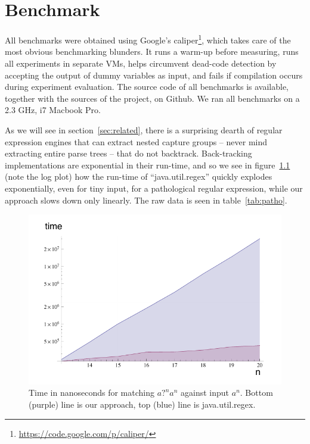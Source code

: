 \documentclass[11pt]{Thesis}
\theoremstyle{definition}
\newcommand{\Figref}[1]{figure~\ref{fig:#1}}
\newcommand{\Secref}[1]{section~\ref{sec:#1}}
\newcommand{\Tabref}[1]{table~\ref{tab:#1}}
\newcommand{\figlabel}[1]{\label{fig:#1}}
\newcommand{\seclabel}[1]{\label{sec:#1}}
\begin{document}
\chapter{Benchmark}
\seclabel{benchmarks}
All benchmarks were obtained using Google's
caliper\footnote{\url{https://code.google.com/p/caliper/}}, which
takes care of the most obvious benchmarking blunders.  It runs a
warm-up before measuring, runs all experiments in separate VMs,
helps circumvent dead-code detection by accepting the output of
dummy variables as input, and fails if compilation occurs during
experiment evaluation.  The source code of all benchmarks is
available, together with the sources of the project, on Github. We
ran all benchmarks on a 2.3 GHz, i7 Macbook Pro.

As we will see in \Secref{related}, there is a surprising dearth
of regular expression engines that can extract nested capture groups
-- never mind extracting entire parse trees -- that do not backtrack.
Back-tracking implementations are exponential in their run-time,
and so we see in \Figref{patho} (note the log plot) how the run-time
of ``java.util.regex'' quickly explodes exponentially, even for tiny input, for
a pathological regular expression, while our approach slows down
only linearly. The raw data is seen in \Tabref{patho}.

\begin{figure}[htp]
\includegraphics[width=\linewidth]{graphs/pathological-with-axes.pdf}
\caption[Pathological regular expression parse time]{Time in nanoseconds for matching $\textit{a?}^n\textit{a}^n$ against
input $\textit{a}^n$. Bottom (purple) line is our approach, top (blue) line is
java.util.regex.}
\figlabel{patho}
\end{figure}
\end{document}
